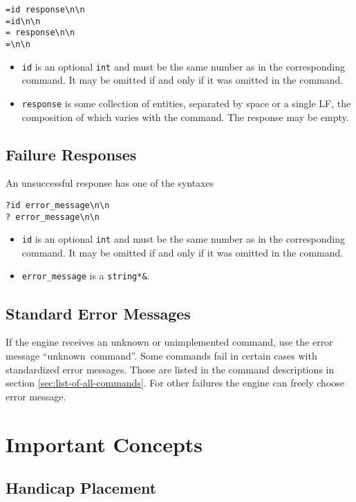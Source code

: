 \documentclass[a4paper]{article}
\begin{document}
\begin{verbatim}
=id response\n\n
=id\n\n
= response\n\n
=\n\n
\end{verbatim}

\begin{itemize}
\item \texttt{id} is an optional \texttt{int} and must be the same
  number as in the corresponding command. It may be omitted if and
  only if it was omitted in the command.
\item \texttt{response} is some collection of entities, separated by
  space or a single LF, the composition of which varies with the
  command.  The response may be empty.
\end{itemize}

\subsection{Failure Responses}
An unsuccessful response has one of the syntaxes
\begin{verbatim}
?id error_message\n\n
? error_message\n\n
\end{verbatim}

\begin{itemize}
\item \texttt{id} is an optional \texttt{int} and must be the same
  number as in the corresponding command. It may be omitted if and
  only if it was omitted in the command.
\item \texttt{error\_message} is a \texttt{string*\&}.
\end{itemize}

\subsection{Standard Error Messages}
\label{sec:standard-error-messages}

If the engine receives an unknown or unimplemented command, use the
error message ``unknown~command''. Some commands fail in certain cases
with standardized error messages. Those are listed in the command
descriptions in section \ref{sec:list-of-all-commands}. For other
failures the engine can freely choose error message.


\newpage
\section{Important Concepts}

\subsection{Handicap Placement}
\end{document}
